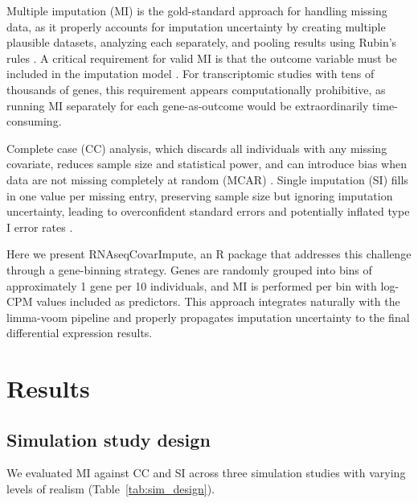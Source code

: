 \documentclass[11pt]{article}
\begin{document}
Multiple imputation (MI) is the gold-standard approach for handling missing data, as it properly accounts for imputation uncertainty by creating multiple plausible datasets, analyzing each separately, and pooling results using Rubin's rules \citep{rubin1987multiple, vanbuuren2011mice, white2011multiple}. A critical requirement for valid MI is that the outcome variable must be included in the imputation model \citep{moons2006using}. For transcriptomic studies with tens of thousands of genes, this requirement appears computationally prohibitive, as running MI separately for each gene-as-outcome would be extraordinarily time-consuming.

Complete case (CC) analysis, which discards all individuals with any missing covariate, reduces sample size and statistical power, and can introduce bias when data are not missing completely at random (MCAR) \citep{little2019statistical}. Single imputation (SI) fills in one value per missing entry, preserving sample size but ignoring imputation uncertainty, leading to overconfident standard errors and potentially inflated type I error rates \citep{donders2006review}.

Here we present RNAseqCovarImpute, an R package that addresses this challenge through a gene-binning strategy. Genes are randomly grouped into bins of approximately 1 gene per 10 individuals, and MI is performed per bin with log-CPM values included as predictors. This approach integrates naturally with the limma-voom pipeline \citep{law2014voom, ritchie2015limma, smyth2004linear} and properly propagates imputation uncertainty to the final differential expression results.

\section{Results}

\subsection{Simulation study design}

We evaluated MI against CC and SI across three simulation studies with varying levels of realism (Table~\ref{tab:sim_design}).
\end{document}
